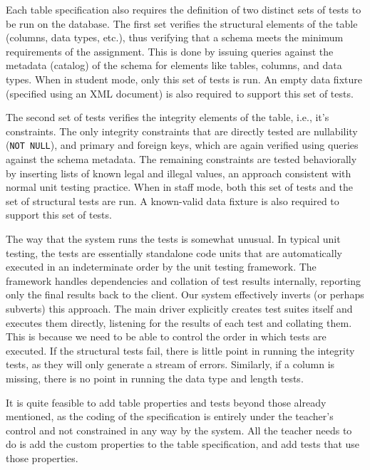 \documentclass[sigconf, authordraft, capitalise]{acmart}
\begin{document}
Each table specification also requires the definition of two distinct sets of tests to be run on the database. The first set verifies the structural elements of the table (columns, data types, etc.), thus verifying that a schema meets the minimum requirements of the assignment. This is done by issuing queries against the metadata (catalog) of the schema for elements like tables, columns, and data types. When in student mode, only this set of tests is run. An empty data fixture (specified using an XML document) is also required to support this set of tests.

The second set of tests verifies the integrity elements of the table, i.e., it's constraints. The only integrity constraints that are directly tested are nullability (\texttt{NOT NULL}), and primary and foreign keys, which are again verified using queries against the schema metadata. The remaining constraints are tested behaviorally by inserting lists of known legal and illegal values, an approach consistent with normal unit testing practice. When in staff mode, both this set of tests and the set of structural tests are run. A known-valid data fixture is also required to support this set of tests.

The way that the system runs the tests is somewhat unusual. In typical unit testing, the tests are essentially standalone code units that are automatically executed in an indeterminate order by the unit testing framework. The framework handles dependencies and collation of test results internally, reporting only the final results back to the client. Our system effectively inverts (or perhaps subverts) this approach. The main driver explicitly creates test suites itself and executes them directly, listening for the results of each test and collating them. This is because we need to be able to control the order in which tests are executed. If the structural tests fail, there is little point in running the integrity tests, as they will only generate a stream of errors. Similarly, if a column is missing, there is no point in running the data type and length tests.

It is quite feasible to add table properties and tests beyond those already mentioned, as the coding of the specification is entirely under the teacher's control and not constrained in any way by the system. All the teacher needs to do is add the custom properties to the table specification, and add tests that use those properties.


\end{document}
